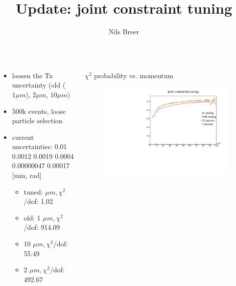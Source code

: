 \documentclass[aspectratio=1610, 12pt]{beamer}
\title{Update: joint constraint tuning}
\author[N.Breer]{Nils Breer}
\institute{TU Dortmund, AG Albrecht}
\begin{document}
\maketitle
\begin{frame}
  \begin{columns}
    \begin{column}[c]{0.48\textwidth}
      \begin{itemize}
        \item loosen the Tx uncertainty (old ($1 \mu m$), $2 \mu m$, $10 \mu m$)
        \item 500k events, loose particle selection
        \item current uncertainties: 0.01 0.0012 0.0019 0.0004 0.00000047 0.00017 [mm, rad]
        \begin{itemize}
          \item tuned:  $\mu m, \chi^2$/dof: 1.02
          \item old: 1 $\mu m, \chi^2$/dof: 914.09
          \item 10 $\mu m, \chi^2$/dof: 55.49
          \item 2 $\mu m, \chi^2$/dof: 492.67
        \end{itemize}
      \end{itemize}
    \end{column}
    \begin{column}[c]{0.48\textwidth}
      $\chi^2$ probability vs. momentum
      \begin{figure}
        \includegraphics[width=\textwidth]{plots/compi/chi2ProbVsMom_comp_looser.pdf}
      \end{figure}
    \end{column}
  \end{columns}
\end{frame}
\end{document}
